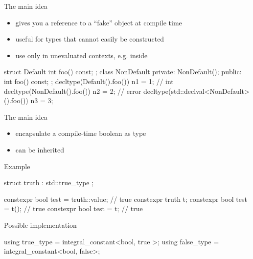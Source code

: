 \begin{frame}[fragile]
  \begin{block}{The main idea}
    \begin{itemize}
    \item gives you a reference to a ``fake'' object at compile time
    \item useful for types that cannot easily be constructed
    \item use only in unevaluated contexts, e.g. inside 
    \end{itemize}
  \end{block}
  \begin{exampleblock}{}
    \begin{cppcode*}{}
      struct Default {
        int foo() const;
      };
      class NonDefault {
        private: NonDefault();
        public:  int foo() const;
      };
      decltype(Default().foo()) n1 = 1;     // int
      decltype(NonDefault().foo()) n2 = 2; // error
      decltype(std::declval<NonDefault>().foo()) n3 = 3;
    \end{cppcode*}
  \end{exampleblock}
\end{frame}

\begin{frame}[fragile]
  \begin{block}{The main idea}
    \begin{itemize}
    \item encapsulate a compile-time boolean as type
    \item can be inherited
    \end{itemize}
  \end{block}
  \begin{exampleblock}{Example}
    \begin{cppcode*}{}
      struct truth : std::true_type { };

      constexpr bool test = truth::value; // true
      constexpr truth t;
      constexpr bool test = t(); // true
      constexpr bool test = t;   // true
    \end{cppcode*}
  \end{exampleblock}
  \begin{exampleblock}{Possible implementation}
    \begin{cppcode*}{}
      using true_type  = integral_constant<bool, true >;
      using false_type = integral_constant<bool, false>;
    \end{cppcode*}
  \end{exampleblock}
\end{frame}


